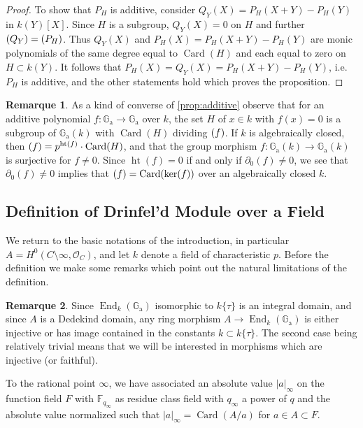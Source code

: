 \documentclass[12pt,a4paper]{article}
\theoremstyle{plain}
\theoremstyle{definition}
\newtheorem{remark}{Remarque}[section]
\theoremstyle{remark}
\DeclareMathOperator{\End}{End}
\DeclareMathOperator{\Card}{Card}
\DeclareMathOperator{\htop}{ht}
\newcommand{\bF}{\mathbb{F}}
\newcommand{\cO}{\mathcal{O}}
\newcommand{\Ga}{\mathbb{G}_\mathrm{a}}
\let\deg\relax
\providecommand{\Ga}{\mathbb{G}_{\mathrm a}}
\providecommand{\cO}{\mathcal{O}}
\providecommand{\End}{\operatorname{End}}
\begin{document}
\begin{proof}
To show that $P_H$ is additive, consider $Q_Y(X) = P_H(X+Y) - P_H(Y)$ in $k(Y)[X]$. Since $H$ is a subgroup, $Q_Y(X) = 0$ on $H$ and further $\deg(Q_Y) = \deg(P_H)$. Thus $Q_Y(X)$ and $P_H(X) = P_H(X+Y) - P_H(Y)$ are monic polynomials of the same degree equal to $\Card(H)$ and each equal to zero on $H \subset k(Y)$. It follows that $P_H(X) = Q_Y(X) = P_H(X+Y) - P_H(Y)$, i.e. $P_H$ is additive, and the other statements hold which proves the proposition.
\end{proof}

\begin{remark}
\label{rem:converse}
As a kind of converse of \eqref{prop:additive} observe that for an additive polynomial $f: \Ga \to \Ga$ over $k$, the set $H$ of $x \in k$ with $f(x) = 0$ is a subgroup of $\Ga(k)$ with $\Card(H)$ dividing $\deg(f)$. If $k$ is algebraically closed, then $\deg(f) = p^{\htop(f)} \cdot \Card(H)$, and that the group morphism $f: \Ga(k) \to \Ga(k)$ is surjective for $f \neq 0$. Since $\htop(f) = 0$ if and only if $\partial_0(f) \neq 0$, we see that $\partial_0(f) \neq 0$ implies that $\deg(f) = \Card(\ker(f))$ over an algebraically closed $k$.
\end{remark}

\subsection{Definition of Drinfel'd Module over a Field}
\label{sec:definition}

We return to the basic notations of the introduction, in particular $A = H^0(C \setminus \infty, \cO_C)$, and let $k$ denote a field of characteristic $p$. Before the definition we make some remarks which point out the natural limitations of the definition.

\begin{remark}
\label{rem:integral}
Since $\End_k(\Ga)$ isomorphic to $k\{\tau\}$ is an integral domain, and since $A$ is a Dedekind domain, any ring morphism $A \to \End_k(\Ga)$ is either injective or has image contained in the constants $k \subset k\{\tau\}$. The second case being relatively trivial means that we will be interested in morphisms which are injective (or faithful).
\end{remark}

To the rational point $\infty$, we have associated an absolute value $|a|_\infty$ on the function field $F$ with $\bF_{q_\infty}$ as residue class field with $q_\infty$ a power of $q$ and the absolute value normalized such that $|a|_\infty = \Card(A/a)$ for $a \in A \subset F$.
\end{document}
